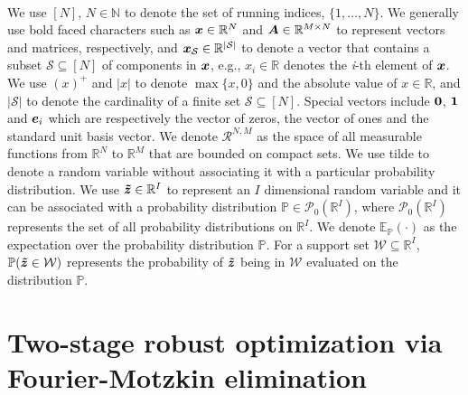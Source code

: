 \documentclass[fleqn,orsc,blindrev]{informs4}
\newcommand{\mb}[1]{\mbox{\boldmath \ensuremath{#1}}}
\newcommand{\mbt}[1]{\mb{\tilde{#1}}}
\renewcommand{\Re}{\mathbb{R}}
\begin{document}
	
	\mbox{}\\
	We use $[N]$, $N \in \mathbb{N}$ to denote the set of running indices, $\{1,\dots,N\}$. We generally use bold faced characters such as $\mb{x} \in \Re^N$ and  $\mb{A} \in \Re^{M \times N}$  to represent  vectors and matrices, respectively, and $\mb{x}_{\mathcal{S}} \in \Re^{|\mathcal{S}|}$ to denote a vector that contains a subset  $\mathcal{S} \subseteq [N]$ of components in $\mb{x}$, e.g., $x_i \in \Re$ denotes the {\em i}-th element of $\mb{x}$. We use $(x)^+$ and $|x|$ to denote $\max\{x,0\}$ and the absolute value of $x \in \mathbb{R}$, and $|\mathcal{S}|$ to denote the cardinality of a finite set $\mathcal{S}\subseteq [N]$. Special vectors include $\mb{0}$, $\mb{1}$ and $\mb{e}_i$ which are respectively the vector of zeros, the  vector of ones and the standard unit basis vector.  We denote $\mathcal{R}^{N,M}$ as the space of all measurable functions from $\Re^N$ to $\Re^M$ that are bounded on compact sets. We use tilde to denote a random variable without associating it with a particular probability distribution. We use  $\mbt{z} \in \Re^{I}$ to represent an $I$ dimensional random variable and it  can be associated with a probability  distribution $\mathbb{P} \in \mathcal{P}_0(\Re^{I})$, where $\mathcal{P}_0(\Re^{I})$ represents the set of all probability distributions on $\Re^{I}$.
	We denote  $\mathbb{E}_{\mathbb{P}}(\cdot)$  as the expectation over the probability distribution $\mathbb{P}$. For a support set $\mathcal{W} \subseteq  \Re^{I}$,  $\mathbb{P}(  \mbt{z}  \in \mathcal{W})$ represents the probability  of $\mbt{z}$ being in $\mathcal{W}$ evaluated on the distribution $\mathbb{P}$.
	
\section{Two-stage robust optimization via Fourier-Motzkin elimination} \label{sec:FME}
	
\end{document}
